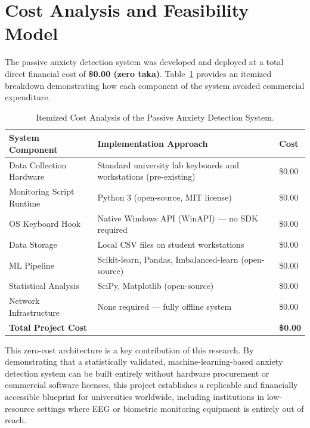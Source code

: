 \section{Cost Analysis and Feasibility Model}
\label{sec:cost}

The passive anxiety detection system was developed and deployed at a total direct financial cost of \textbf{\$0.00 (zero taka)}. Table~\ref{tab:cost_analysis} provides an itemized breakdown demonstrating how each component of the system avoided commercial expenditure.

\begin{table}[htbp]
    \centering
    \small
    \caption{Itemized Cost Analysis of the Passive Anxiety Detection System.}
    \label{tab:cost_analysis}
    \begin{tabular}{|p{4.5cm}|p{4.5cm}|p{3.5cm}|}
        \hline
        \textbf{System Component} & \textbf{Implementation Approach} & \textbf{Cost} \\ \hline
        Data Collection Hardware & Standard university lab keyboards and workstations (pre-existing) & \$0.00 \\ \hline
        Monitoring Script Runtime & Python 3 (open-source, MIT license) & \$0.00 \\ \hline
        OS Keyboard Hook & Native Windows API (WinAPI) — no SDK required & \$0.00 \\ \hline
        Data Storage & Local CSV files on student workstations & \$0.00 \\ \hline
        ML Pipeline & Scikit-learn, Pandas, Imbalanced-learn (open-source) & \$0.00 \\ \hline
        Statistical Analysis & SciPy, Matplotlib (open-source) & \$0.00 \\ \hline
        Network Infrastructure & None required — fully offline system & \$0.00 \\ \hline
        \textbf{Total Project Cost} & & \textbf{\$0.00} \\ \hline
    \end{tabular}
\end{table}

\noindent This zero-cost architecture is a key contribution of this research. By demonstrating that a statistically validated, machine-learning-based anxiety detection system can be built entirely without hardware procurement or commercial software licenses, this project establishes a replicable and financially accessible blueprint for universities worldwide, including institutions in low-resource settings where EEG or biometric monitoring equipment is entirely out of reach.

